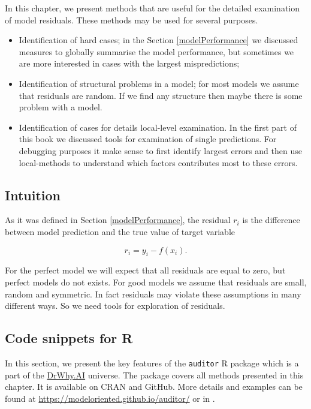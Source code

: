 \documentclass[12pt,]{krantz}
\providecommand{\tightlist}{%
  \setlength{\itemsep}{0pt}\setlength{\parskip}{0pt}}
\begin{document}
In this chapter, we present methods that are useful for the detailed examination of model residuals. These methods may be used for several purposes.

\begin{itemize}
\tightlist
\item
  Identification of hard cases; in the Section \ref{modelPerformance} we discussed measures to globally summarise the model performance, but sometimes we are more interested in cases with the largest mispredictions;
\item
  Identification of structural problems in a model; for most models we assume that residuals are random. If we find any structure then maybe there is some problem with a model.
\item
  Identification of cases for details local-level examination. In the first part of this book we discussed tools for examination of single predictions. For debugging purposes it make sense to first identify largest errors and then use local-methods to understand which factors contributes most to these errors.
\end{itemize}

\hypertarget{intuition}{%
\subsection{Intuition}\label{intuition}}

As it was defined in Section \ref{modelPerformance}, the residual \(r_i\) is the difference between model prediction and the true value of target variable

\[
r_i = y_i - f(x_i).
\]

For the perfect model we will expect that all residuals are equal to zero, but perfect models do not exists.
For good models we assume that residuals are small, random and symmetric. In fact residuals may violate these assumptions in many different ways. So we need tools for exploration of residuals.

\hypertarget{code-snippets-for-r}{%
\subsection{Code snippets for R}\label{code-snippets-for-r}}

In this section, we present the key features of the \texttt{auditor} R package \citep{auditor} which is a part of the \href{http://DrWhy.AI}{DrWhy.AI} universe. The package covers all methods presented in this chapter. It is available on CRAN and GitHub. More details and examples can be found at \url{https://modeloriented.github.io/auditor/} or in \citep{auditorarxiv}.
\end{document}
